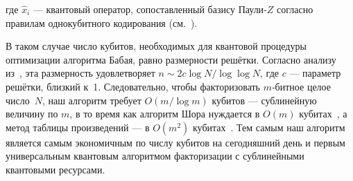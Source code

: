 где $\hat{x}_i$ — квантовый оператор, сопоставленный базису Паули‑$Z$ согласно
правилам однокубитного кодирования (см.~\cite{cite_31}).

В таком случае число кубитов, необходимых для квантовой процедуры оптимизации
алгоритма Бабая, равно размерности решётки. Согласно анализу из \cite{cite_31},
эта размерность удовлетворяет $n\sim 2c\log N/\log\log N$, где $c$ — параметр
решётки, близкий к 1. Следовательно, чтобы факторизовать $m$‑битное целое
число $N$, наш алгоритм требует $O(m/\log m)$ кубитов — сублинейную величину по
$m$, в то время как алгоритм Шора нуждается в $O(m)$ кубитах \cite{cite_13}, а
метод таблицы произведений — в $O(m^{2})$ кубитах \cite{cite_25}. Тем самым наш
алгоритм является самым экономичным по числу кубитов на сегодняшний день и
первым универсальным квантовым алгоритмом факторизации с сублинейными
квантовыми ресурсами.
